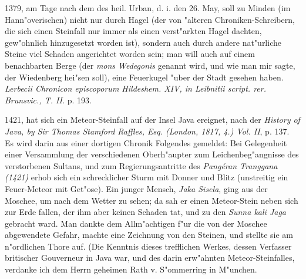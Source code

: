 \documentclass[a4paper, 11pt, oneside, polutonikogreek, german]{article}
\begin{document}
1379, am Tage nach dem des heil. Urban, d. i. den 26. May, soll zu Minden (im Hann"overischen) nicht nur durch Hagel (der von "alteren Chroniken-Schreibern, die sich einen Steinfall nur immer als einen verst"arkten Hagel dachten, gew"ohnlich hinzugesetzt worden ist), sondern auch durch andere nat"urliche Steine viel Schaden angerichtet worden sein; man will auch auf einem benachbarten Berge (der \emph{mons Wedegonis} genannt wird, und wie man mir sagte, der Wiedenberg hei"sen soll), eine Feuerkugel "uber der Stadt gesehen haben. \emph{Lerbecii Chronicon episcoporum Hildeshem. XIV, in Leibnitii script. rer. Brunsvic., T. II.} p. 193.

1421, hat sich ein Meteor-Steinfall auf der Insel Java ereignet, nach der \emph{History of Java, by Sir Thomas Stamford Raffles, Esq. (London, 1817, 4.) Vol. II}, p. 137. Es wird darin aus einer dortigen Chronik Folgendes gemeldet: Bei Gelegenheit einer Versammlung der verschiedenen Oberh"aupter zum Leichenbeg"angnisse des verstorbenen Sultans, und zum Regierungsantritte des \emph{Pangéran Tranggana (1421)} erhob sich ein schrecklicher Sturm mit Donner und Blitz (unstreitig ein Feuer-Meteor mit Get"ose). Ein junger Mensch, \emph{Jaka Sisela}, ging aus der Moschee, um nach dem Wetter zu sehen; da sah er einen Meteor-Stein neben sich zur Erde fallen, der ihm aber keinen Schaden tat, und zu den \emph{Sunna kali Jaga} gebracht ward. Man dankte dem Allm"achtigen f"ur die von der Moschee abgewendete Gefahr, machte eine Zeichnung von den Steinen, und stellte sie am n"ordlichen Thore auf. (Die Kenntnis dieses trefflichen Werkes, dessen Verfasser britischer Gouverneur in Java war, und des darin erw"ahnten Meteor-Steinfalles, verdanke ich dem Herrn geheimen Rath v. S"ommerring in M"unchen.
\end{document}
